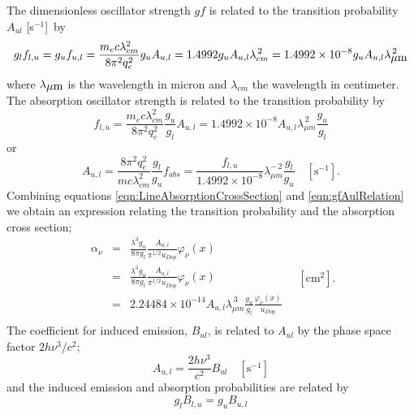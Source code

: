 The dimensionless oscillator strength $gf$ is related to the transition
probability $A_{ul}$ [s$^{-1}$]~by
\begin{equation}
{g_l}{f_{l,u}} = {g_u}{f_{u,l}} = \frac{{{m_e}c\lambda _{cm}^2}}{{8{\pi
^2}q_e^2}}{g_u}{A_{u,l}} = 1.4992{g_u}{A_{u,l}}\lambda _{cm}^{\,2} = 1.4992
\times {10^{ - 8}}{g_u}{A_{u,l}}\lambda _{\hbox{$\mu$m}}^{\,2}
\end{equation}
where $\lambda_{\hbox{$\mu$m}}$ is the wavelength in micron and $\lambda_{cm}$ the wavelength in centimeter.
The absorption oscillator strength is related to the
transition probability by
\begin{equation}
\label{eqn:gfAulRelation}
{f_{l,u}} = \frac{{{m_e}c\lambda _{cm}^2}}{{8{\pi
^2}q_e^2}}\frac{{{g_u}}}{{{g_l}}}{A_{u,l}} = 1.4992 \times {10^{ -
8}}{A_{u,l}}\lambda _{\mu m}^{\,2}\frac{{{g_u}}}{{{g_l}}}
\end{equation}
or
\begin{equation}
{A_{u,l}} = \frac{{8{\pi ^2}q_e^2}}{{mc\lambda
_{cm}^2}}\frac{{{g_l}}}{{{g_u}}}{f_{abs}} = \frac{{{f_{l,u}}}}{{1.4992 \times
{{10}^{ - 8}}}}\lambda _{\mu m}^{ - \,2}\frac{{{g_l}}}{{{g_u}}}\quad
[\mathrm{s}^{-1}].
\end{equation}
Combining equations \ref{eqn:LineAbsorptionCrossSection}
and \ref{eqn:gfAulRelation} we obtain an expression relating the
transition probability and the absorption cross section;
\begin{equation}
\begin{array}{ccl}
 {\alpha _\nu }& =& \frac{{{\lambda ^3}{g_u}}}{{8\pi
{g_l}}}\frac{{{A_{u,l}}}}{{{\pi ^{1/2}}{u_{Dop}}}}{\varphi _\nu }\left(
x \right) \\
&=& \frac{{{\lambda ^3}{g_u}}}{{8\pi {g_l}}}\frac{{{A_{u,l}}}}{{{\pi
^{1/2}}{u_{Dop}}}}{\varphi _\nu }\left( x \right) \\
&=& 2.24484 \times {10^{ - 14}}{A_{u,l}}\lambda _{\mu
m}^{\,3}\frac{{{g_u}}}{{{g_l}}}\frac{{{\varphi _\nu }\left( x
\right)}}{{{u_{Dop}}}} \\
 \end{array}
\quad  [\mathrm{cm}^2].
\end{equation}
The coefficient for induced emission,
$B_{ul}$, is related to $A_{ul}$ by the phase
space factor $2h{\nu ^3}/{c^2}$;
\begin{equation}
{A_{u,l}} = \frac{{2h{\nu ^3}}}{{{c^2}}}{B_{ul}}
\quad [\mathrm{s}^{-1}]
\end{equation}
and the induced emission and absorption probabilities are related by
\begin{equation}
{g_l}{B_{l,u}} = {g_u}{B_{u,l}}
\end{equation}
